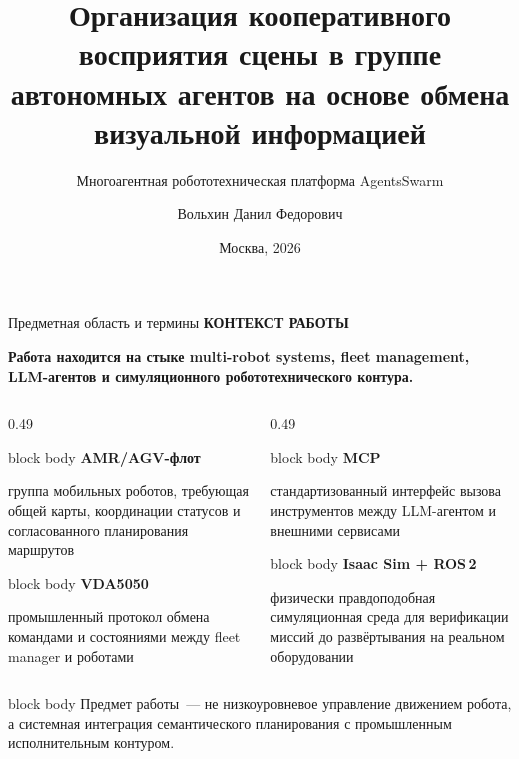 \documentclass[aspectratio=169,11pt]{beamer}
\title{Организация кооперативного восприятия сцены в группе автономных агентов на основе обмена визуальной информацией}
\subtitle{Многоагентная робототехническая платформа AgentsSwarm}
\author{Вольхин Данил Федорович}
\institute{Факультет компьютерных наук\\Исследование и предпринимательство в искусственном интеллекте}
\date{Москва, 2026}
\newcommand{\keybox}[2]{%
  \begin{beamercolorbox}[wd=\linewidth,sep=0.14cm]{block body}
    {\color{hseblue}\bfseries #1}\par
    \vspace{0.04cm}
    {\small #2}
  \end{beamercolorbox}
}
\newcommand{\sectiontag}[1]{%
  {\scriptsize\bfseries\color{hsegray}\MakeUppercase{#1}}\par\vspace{0.06cm}
}
\begin{document}


\begin{frame}{Предметная область и термины}
  \sectiontag{Контекст работы}
  {\large\bfseries Работа находится на стыке multi-robot systems, fleet management,
  LLM-агентов и симуляционного робототехнического контура.}
  \vspace{0.18cm}

  \begin{columns}[T,onlytextwidth]
    \begin{column}{0.49\textwidth}
      \begin{minipage}[t][2.10cm][t]{\linewidth}
        \keybox{AMR/AGV-флот}{группа мобильных роботов, требующая общей карты, координации статусов и согласованного планирования маршрутов}
      \end{minipage}
      \vspace{0.14cm}
      \keybox{VDA5050}{промышленный протокол обмена командами и состояниями между fleet manager и роботами}
    \end{column}
    \begin{column}{0.49\textwidth}
      \begin{minipage}[t][2.10cm][t]{\linewidth}
        \keybox{MCP}{стандартизованный интерфейс вызова инструментов между LLM-агентом и внешними сервисами}
      \end{minipage}
      \vspace{0.14cm}
      \keybox{Isaac Sim + ROS\,2}{физически правдоподобная симуляционная среда для верификации миссий до развёртывания на реальном оборудовании}
    \end{column}
  \end{columns}

  \vspace{0.06cm}
  \begin{beamercolorbox}[wd=\linewidth,sep=0.13cm]{block body}
    \small Предмет работы~--- не низкоуровневое управление движением робота, а системная интеграция
    семантического планирования с промышленным исполнительным контуром.
  \end{beamercolorbox}
\end{frame}
\end{document}
